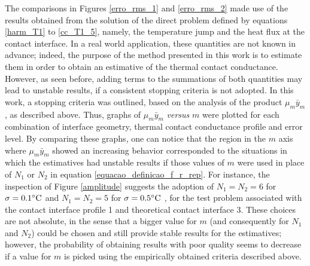 \documentclass[12pt]{CHT-20}
\begin{document}
The comparisons in Figures \ref{erro_rms_1} and \ref{erro_rms_2} made use of the results obtained from the solution of the direct problem defined by equations \eqref{harm_T1} to \eqref{cc_T1_5}, namely, the temperature jump and the heat flux at the contact interface. In a real world application, these quantities are not known in advance; indeed, the purpose of the method presented in this work is to estimate them in order to obtain an estimative of the thermal contact conductance. However, as seen before, adding terms to the summations of both quantities may lead to unstable results, if a consistent stopping criteria is not adopted. In this work, a stopping criteria was outlined, based on the analysis of the product $\mu_m\bar{y}_m$, as described above. Thus, graphs of $\mu_m\bar{y}_m$ \textit{versus} $m$ were plotted for each combination of interface geometry, thermal contact conductance profile and error level. By comparing these graphs, one can notice that the region in the $m$ axis where $\mu_m\bar{y}_m$ showed an increasing behavior corresponded to the situations in which the estimatives had unstable results if those values of $m$ were used in place of $N_1$ or $N_2$ in equation \eqref{equacao_definicao_f_r_rep}. For instance, the inspection of Figure \ref{amplitude} suggests the adoption of $N_1 = N_2 = 6$ for $\sigma = 0.1\celsius$ and $N_1 = N_2 = 5$ for $\sigma = 0.5\celsius$ , for the test problem associated with the contact interface profile 1 and theoretical contact interface 3. These choices are not absolute, in the sense that a bigger value for $m$ (and consequently for $N_1$ and $N_2$) could be chosen and still provide stable results for the estimatives; however, the probability of obtaining results with poor quality seems to decrease if a value for $m$ is picked using the empirically obtained criteria described above.
\end{document}
